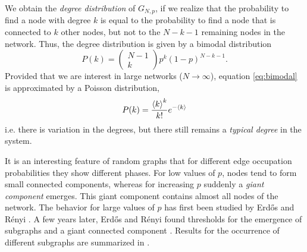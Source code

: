 \documentclass[openright,twoside,headsepline]{scrbook}
\begin{document}
We obtain the \emph{degree distribution} of $G_{N,p}$, if we realize that the probability to find a node with degree $k$ is equal to the probability to find a node that is connected to $k$ other nodes, but not to the $N-k-1$ remaining nodes in the network.
Thus, the degree distribution is given by a bimodal distribution
\begin{equation}\label{eq:bimodal}
P(k)= \left(\begin{array}{c}N-1 \\k\end{array}\right) p^k (1-p)^{N-k-1} .
\end{equation}
Provided that we are interest in large networks ($N\rightarrow \infty $), equation \eqref{eq:bimodal} is approximated by a Poisson distribution, 
\begin{equation}\label{eq:poisson_distribution}
P(k) =\frac{\left< k \right>^k }{k!} e^{-\left< k \right>}
\end{equation}
i.e. there is variation in the degrees, but there still remains a \emph{typical degree} in the system.

It is an interesting feature of random graphs that for different edge occupation probabilities they show different phases.
For low values of $p$, nodes tend to form small connected components, whereas for increasing $p$ suddenly a \emph{giant component} emerges.
This giant component contains almost all nodes of the network.
The behavior for large values of $p$ has first been studied by Erd\H{o}s and R\'enyi \citep{ER:1959}.
A few years later, Erd\H{o}s and R\'enyi found thresholds for the emergence of subgraphs and a giant connected component \citep{ER:1960,ER:1961}.
Results for the occurrence of different subgraphs are summarized in \citep{RevModPhys.74}.
\end{document}
